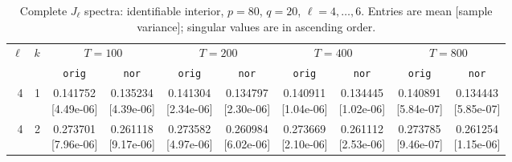 \documentclass[12pt,letterpaper]{article}
\def\spacingset#1{\renewcommand{\baselinestretch}{#1}\small\normalsize}
\theoremstyle{plain}
\theoremstyle{definition}
\begin{document}
\clearpage
\begin{table}[p]
\begingroup
\spacingset{1.0}
\small\centering
\caption{Complete $J_\ell$ spectra: identifiable interior, $p=80$, $q=20$, $\ell=4,\ldots,6$. Entries are mean [sample variance]; singular values are in ascending order.}
\label{s23:lambda:alltab:spectra:p80q20interior:4-6}
\footnotesize
\setlength{\tabcolsep}{2.2pt}
\renewcommand{\arraystretch}{1.03}
\begin{adjustbox}{max width=\linewidth}
\begin{tabular}{@{}rr*{8}{c}@{}}
\toprule
$\ell$ & $k$ & \multicolumn{2}{c}{$T=100$} & \multicolumn{2}{c}{$T=200$} & \multicolumn{2}{c}{$T=400$} & \multicolumn{2}{c}{$T=800$}\\
\cmidrule(lr){3-4}\cmidrule(lr){5-6}\cmidrule(lr){7-8}\cmidrule(lr){9-10}
 &  & \texttt{orig} & \texttt{nor} & \texttt{orig} & \texttt{nor} & \texttt{orig} & \texttt{nor} & \texttt{orig} & \texttt{nor}\\
\midrule
4 & 1 & \shortstack{0.141752\\[-1pt]{\scriptsize[4.49e-06]}} & \shortstack{0.135234\\[-1pt]{\scriptsize[4.39e-06]}} & \shortstack{0.141304\\[-1pt]{\scriptsize[2.34e-06]}} & \shortstack{0.134797\\[-1pt]{\scriptsize[2.30e-06]}} & \shortstack{0.140911\\[-1pt]{\scriptsize[1.04e-06]}} & \shortstack{0.134445\\[-1pt]{\scriptsize[1.02e-06]}} & \shortstack{0.140891\\[-1pt]{\scriptsize[5.84e-07]}} & \shortstack{0.134443\\[-1pt]{\scriptsize[5.85e-07]}}\\
4 & 2 & \shortstack{0.273701\\[-1pt]{\scriptsize[7.96e-06]}} & \shortstack{0.261118\\[-1pt]{\scriptsize[9.17e-06]}} & \shortstack{0.273582\\[-1pt]{\scriptsize[4.97e-06]}} & \shortstack{0.260984\\[-1pt]{\scriptsize[6.02e-06]}} & \shortstack{0.273669\\[-1pt]{\scriptsize[2.10e-06]}} & \shortstack{0.261112\\[-1pt]{\scriptsize[2.53e-06]}} & \shortstack{0.273785\\[-1pt]{\scriptsize[9.46e-07]}} & \shortstack{0.261254\\[-1pt]{\scriptsize[1.15e-06]}}\\

\end{tabular}
\end{adjustbox}
\end{table}
\end{document}
